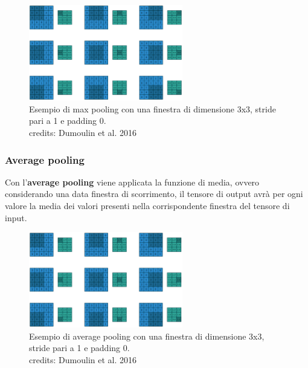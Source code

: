     \begin{figure}[H]
        \centering
        \includegraphics[width=0.6\textwidth]{imgs/max_pooling.png}
        \caption{Esempio di max pooling con una finestra di dimensione 3x3, stride pari a 1 e padding 0.\\
        credits: Dumoulin et al. 2016 \cite{dumoulin2016guide}}
        \label{fig:max_pooling}
    \end{figure}

\subsubsection{Average pooling}
Con l'\textbf{average pooling} viene applicata la funzione di media, ovvero considerando una data finestra di scorrimento, il tensore di output avrà
per ogni valore la media dei valori presenti nella corrispondente finestra del tensore di input.

    \begin{figure}[H]
        \centering
        \includegraphics[width=0.6\textwidth]{imgs/avg_pooling.png}
        \caption{Esempio di average pooling con una finestra di dimensione 3x3, stride pari a 1 e padding 0.\\
        credits: Dumoulin et al. 2016 \cite{dumoulin2016guide}}
        \label{fig:average_pooling}
    \end{figure}





